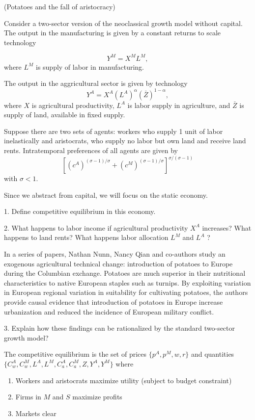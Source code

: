 (Potatoes and the fall of aristocracy)

Consider a two-sector version of the neoclassical growth model without capital. The output in the manufacturing is given by a constant returns to scale technology

$$
Y^M=X^M L^M,
$$
where $L^M$ is supply of labor in manufacturing.

The output in the aggricultural sector is given by technology
$$
Y^A=X^A\left(L^A\right)^\alpha(\bar{Z})^{1-\alpha},
$$
where $X$ is agricultural productivity, $L^A$ is labor supply in agriculture, and $\bar{Z}$ is supply of land, available in fixed supply.

Suppose there are two sets of agents: workers who supply 1 unit of labor inelastically and aristocrats, who supply no labor but own land and receive land rents. Intratemporal preferences of all agents are given by
$$
\left[\left(c^A\right)^{(\sigma-1) / \sigma}+\left(c^M\right)^{(\sigma-1) / \sigma}\right]^{\sigma /(\sigma-1)}
$$
with $\sigma<1$.

Since we abstract from capital, we will focus on the static economy.

1. Define competitive equilibrium in this economy.

2. What happens to labor income if agricultural productivity $X^A$ increases? What happens to land rents? What happens labor allocation $L^M$ and $L^A$ ?

In a series of papers, Nathan Nunn, Nancy Qian and co-authors study an exogenous agricultural technical change: introduction of potatoes to Europe during the Columbian exchange. Potatoes are much superior in their nutritional characteristics to native European staples such as turnips. By exploiting variation in European regional variation in suitability for cultivating potatoes, the authors provide causal evidence that introduction of potatoes in Europe increase urbanization and reduced the incidence of European military conflict.

3. Explain how these findings can be rationalized by the standard two-sector growth model?



The competitive equilibrium is the set of prices $\{p^A, p^M, w, r\}$ and quantities $\{C_w^A, C_w^M, L^A, L^M, C_a^A, C_a^M, Z, Y^A, Y^M\}$ where

\begin{enumerate}
    \item Workers and aristocrats maximize utility (subject to budget constraint)
    \item Firms in $M$ and $S$ maximize profits 
    \item Markets clear
\end{enumerate}

